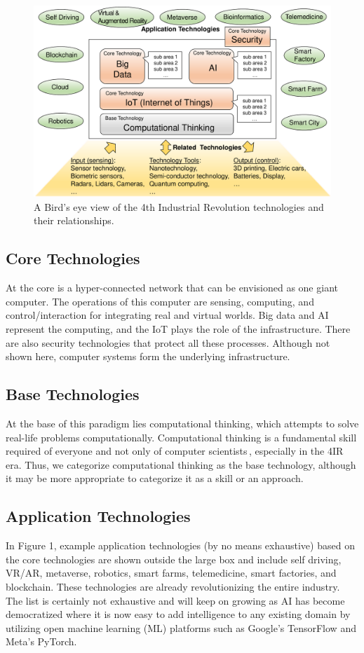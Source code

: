 \documentclass[11pt]{article}
\begin{document}
\begin{figure}[h]
  \centering
  \includegraphics[width=\textwidth]{4IR.pdf}
  \caption{A Bird's eye view of the 4th Industrial Revolution technologies and their relationships.}
  \label{fig:4ir}
\end{figure}

\subsection{Core Technologies}
At the core is a hyper-connected network that can be envisioned as one giant computer. The operations of this computer are sensing, computing, and control/interaction for integrating real and virtual worlds. Big data and AI represent the computing, and the IoT plays the role of the infrastructure. There are also security technologies that protect all these processes. Although not shown here, computer systems form the underlying infrastructure.

\subsection{Base Technologies}
At the base of this paradigm lies computational thinking, which attempts to solve real-life problems computationally. Computational thinking is a fundamental skill required of everyone and not only of computer scientists\,\cite{DBLP:journals/cacm/Wing06}, especially in the 4IR era. Thus, we categorize computational thinking as the base technology, although it may be more appropriate to categorize it as a skill or an approach.

\subsection{Application Technologies}
In Figure 1, example application technologies (by no means exhaustive) based on the core technologies are shown outside the large box and include self driving, VR/AR, metaverse, robotics, smart farms, telemedicine, smart factories, and blockchain. These technologies are already revolutionizing the entire industry. The list is certainly not exhaustive and will keep on growing as AI has become democratized where it is now easy to add intelligence to any existing domain by utilizing open machine learning (ML) platforms such as Google’s TensorFlow and Meta’s PyTorch.
\end{document}
